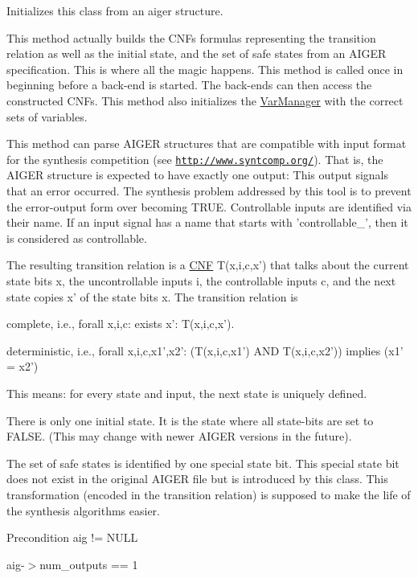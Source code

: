 Initializes this class from an aiger structure. 

This method actually builds the C\-N\-Fs formulas representing the transition relation as well as the initial state, and the set of safe states from an A\-I\-G\-E\-R specification. This is where all the magic happens. This method is called once in beginning before a back-\/end is started. The back-\/ends can then access the constructed C\-N\-Fs. This method also initializes the \hyperlink{classVarManager}{Var\-Manager} with the correct sets of variables.

This method can parse A\-I\-G\-E\-R structures that are compatible with input format for the synthesis competition (see \href{http://www.syntcomp.org/}{\tt http\-://www.\-syntcomp.\-org/}). That is, the A\-I\-G\-E\-R structure is expected to have exactly one output\-: This output signals that an error occurred. The synthesis problem addressed by this tool is to prevent the error-\/output form over becoming T\-R\-U\-E. Controllable inputs are identified via their name. If an input signal has a name that starts with 'controllable\-\_\-', then it is considered as controllable.

The resulting transition relation is a \hyperlink{classCNF}{C\-N\-F} T(x,i,c,x') that talks about the current state bits x, the uncontrollable inputs i, the controllable inputs c, and the next state copies x' of the state bits x. The transition relation is 
\begin{DoxyItemize}
\item complete, i.\-e., forall x,i,c\-: exists x'\-: T(x,i,c,x'). 
\item deterministic, i.\-e., forall x,i,c,x1',x2'\-: (T(x,i,c,x1') A\-N\-D T(x,i,c,x2')) implies (x1' = x2') 
\end{DoxyItemize}This means\-: for every state and input, the next state is uniquely defined.

There is only one initial state. It is the state where all state-\/bits are set to F\-A\-L\-S\-E. (This may change with newer A\-I\-G\-E\-R versions in the future).

The set of safe states is identified by one special state bit. This special state bit does not exist in the original A\-I\-G\-E\-R file but is introduced by this class. This transformation (encoded in the transition relation) is supposed to make the life of the synthesis algorithms easier.

\begin{DoxyPrecond}{Precondition}
aig != N\-U\-L\-L 

aig-\/$>$num\-\_\-outputs == 1 
\end{DoxyPrecond}

